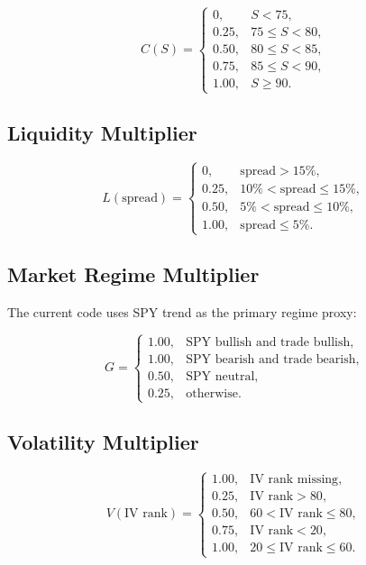 \documentclass[11pt]{article}
\begin{document}
\[
C(S) =
\begin{cases}
0, & S < 75,\\
0.25, & 75 \le S < 80,\\
0.50, & 80 \le S < 85,\\
0.75, & 85 \le S < 90,\\
1.00, & S \ge 90.
\end{cases}
\]

\subsection{Liquidity Multiplier}

\[
L(\text{spread}) =
\begin{cases}
0, & \text{spread} > 15\%,\\
0.25, & 10\% < \text{spread} \le 15\%,\\
0.50, & 5\% < \text{spread} \le 10\%,\\
1.00, & \text{spread} \le 5\%.
\end{cases}
\]

\subsection{Market Regime Multiplier}

The current code uses SPY trend as the primary regime proxy:

\[
G =
\begin{cases}
1.00, & \text{SPY bullish and trade bullish},\\
1.00, & \text{SPY bearish and trade bearish},\\
0.50, & \text{SPY neutral},\\
0.25, & \text{otherwise}.
\end{cases}
\]

\subsection{Volatility Multiplier}

\[
V(\text{IV rank}) =
\begin{cases}
1.00, & \text{IV rank missing},\\
0.25, & \text{IV rank} > 80,\\
0.50, & 60 < \text{IV rank} \le 80,\\
0.75, & \text{IV rank} < 20,\\
1.00, & 20 \le \text{IV rank} \le 60.
\end{cases}
\]
\end{document}
